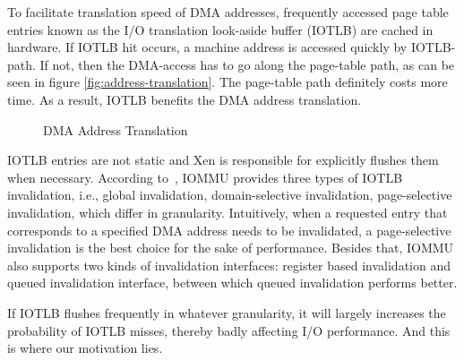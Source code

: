 To facilitate translation speed of DMA addresses, frequently accessed page table entries known as the I/O translation look-aside buffer (IOTLB) are cached in hardware. If IOTLB hit occurs, a machine address is accessed quickly by IOTLB-path. If not, then the DMA-access has to go along the page-table path, as can be seen in figure \ref{fig:address-translation}. The page-table path definitely costs more time. As a result, IOTLB benefits the DMA address translation.

\begin{figure}
\centering
{}
\hspace{1in}
\caption{DMA Address Translation}
\label{fig:dma-add-trans} %
\end{figure}

IOTLB entries are not static and Xen is responsible for explicitly flushes them when necessary. According to~\cite{intelvt}, IOMMU provides three types of IOTLB invalidation, i.e., global invalidation, domain-selective invalidation, page-selective invalidation, which differ in granularity. Intuitively, when a requested entry that corresponds to a specified DMA address needs to be invalidated, a page-selective invalidation is the best choice for the sake of performance. Besides that, IOMMU also supports two kinds of invalidation interfaces: register based invalidation and queued invalidation interface, between which queued invalidation performs better.

If IOTLB flushes frequently in whatever granularity, it will largely increases the probability of IOTLB misses, thereby badly affecting I/O performance. And this is where our motivation lies.

